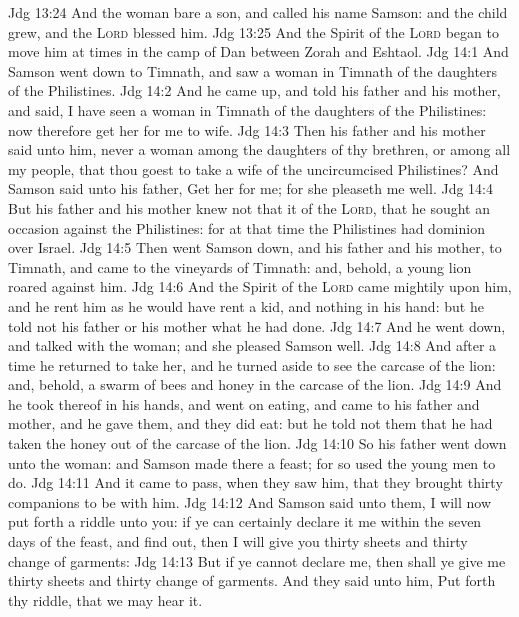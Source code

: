 \vs Jdg 13:24 And the woman bare a son, and called his name Samson: and the child grew, and the \textsc{Lord} blessed him.
\vs Jdg 13:25 And the Spirit of the \textsc{Lord} began to move him at times in the camp of Dan between Zorah and Eshtaol.
\vs Jdg 14:1 And Samson went down to Timnath, and saw a woman in Timnath of the daughters of the Philistines.
\vs Jdg 14:2 And he came up, and told his father and his mother, and said, I have seen a woman in Timnath of the daughters of the Philistines: now therefore get her for me to wife.
\vs Jdg 14:3 Then his father and his mother said unto him,  never a woman among the daughters of thy brethren, or among all my people, that thou goest to take a wife of the uncircumcised Philistines? And Samson said unto his father, Get her for me; for she pleaseth me well.
\vs Jdg 14:4 But his father and his mother knew not that it  of the \textsc{Lord}, that he sought an occasion against the Philistines: for at that time the Philistines had dominion over Israel.
\vs Jdg 14:5 Then went Samson down, and his father and his mother, to Timnath, and came to the vineyards of Timnath: and, behold, a young lion roared against him.
\vs Jdg 14:6 And the Spirit of the \textsc{Lord} came mightily upon him, and he rent him as he would have rent a kid, and  nothing in his hand: but he told not his father or his mother what he had done.
\vs Jdg 14:7 And he went down, and talked with the woman; and she pleased Samson well.
\vs Jdg 14:8 And after a time he returned to take her, and he turned aside to see the carcase of the lion: and, behold,  a swarm of bees and honey in the carcase of the lion.
\vs Jdg 14:9 And he took thereof in his hands, and went on eating, and came to his father and mother, and he gave them, and they did eat: but he told not them that he had taken the honey out of the carcase of the lion.
\vs Jdg 14:10 So his father went down unto the woman: and Samson made there a feast; for so used the young men to do.
\vs Jdg 14:11 And it came to pass, when they saw him, that they brought thirty companions to be with him.
\vs Jdg 14:12 And Samson said unto them, I will now put forth a riddle unto you: if ye can certainly declare it me within the seven days of the feast, and find  out, then I will give you thirty sheets and thirty change of garments:
\vs Jdg 14:13 But if ye cannot declare  me, then shall ye give me thirty sheets and thirty change of garments. And they said unto him, Put forth thy riddle, that we may hear it.
